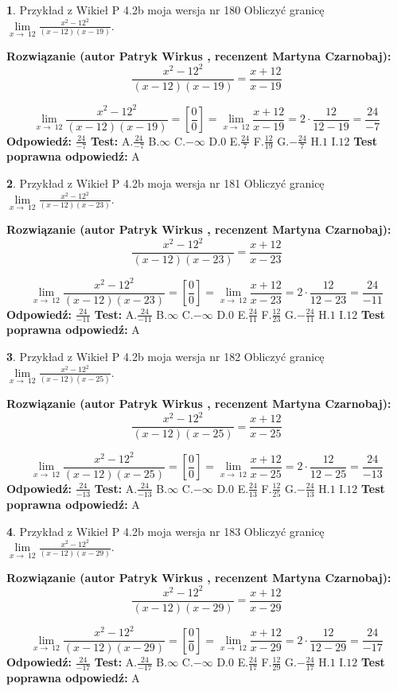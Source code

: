 \documentclass[12pt, a4paper]{article}
\theoremstyle{definition} %
\newtheorem{zad}{}
\newcommand{\zadStart}[1]{\begin{zad}#1\newline}
\newcommand{\zadStop}{\end{zad}}
\newcommand{\rozwStart}[2]{\noindent \textbf{Rozwiązanie (autor #1 , recenzent #2): }\newline}
\newcommand{\rozwStop}{\newline}
\newcommand{\odpStart}{\noindent \textbf{Odpowiedź:}\newline}
\newcommand{\odpStop}{\newline}
\newcommand{\testStart}{\noindent \textbf{Test:}\newline}
\newcommand{\testStop}{\newline}
\newcommand{\kluczStart}{\noindent \textbf{Test poprawna odpowiedź:}\newline}
\newcommand{\kluczStop}{\newline}
\begin{document}
\zadStart{Przykład z Wikieł P 4.2b moja wersja nr 180}
Obliczyć granicę $\lim\limits_{x\to\ 12}\frac{x^{2}-12^{2}}{(x-12)(x-19)}$.
\zadStop
\rozwStart{Patryk Wirkus}{Martyna Czarnobaj}
$$\frac{x^{2}-12^{2}}{(x-12)(x-19)}=\frac{x+12}{x-19}$$

$$\lim\limits_{x\to\ 12}\frac{x^{2}-12^{2}}{(x-12)(x-19)}=[\frac{0}{0}]=\lim\limits_{x\to\ 12}\frac{x+12}{x-19}=2 \cdot \frac{12}{12-19} = \frac{24}{-7}$$
\rozwStop
\odpStart
$\frac{24}{-7}$
\odpStop
\testStart
A.$\frac{24}{-7}$
B.$\infty$
C.$-\infty$
D.$0$
E.$\frac{24}{7}$
F.$\frac{12}{19}$
G.$-\frac{24}{7}$
H.$1$
I.$12$
\testStop
\kluczStart
A
\kluczStop



\zadStart{Przykład z Wikieł P 4.2b moja wersja nr 181}
Obliczyć granicę $\lim\limits_{x\to\ 12}\frac{x^{2}-12^{2}}{(x-12)(x-23)}$.
\zadStop
\rozwStart{Patryk Wirkus}{Martyna Czarnobaj}
$$\frac{x^{2}-12^{2}}{(x-12)(x-23)}=\frac{x+12}{x-23}$$

$$\lim\limits_{x\to\ 12}\frac{x^{2}-12^{2}}{(x-12)(x-23)}=[\frac{0}{0}]=\lim\limits_{x\to\ 12}\frac{x+12}{x-23}=2 \cdot \frac{12}{12-23} = \frac{24}{-11}$$
\rozwStop
\odpStart
$\frac{24}{-11}$
\odpStop
\testStart
A.$\frac{24}{-11}$
B.$\infty$
C.$-\infty$
D.$0$
E.$\frac{24}{11}$
F.$\frac{12}{23}$
G.$-\frac{24}{11}$
H.$1$
I.$12$
\testStop
\kluczStart
A
\kluczStop



\zadStart{Przykład z Wikieł P 4.2b moja wersja nr 182}
Obliczyć granicę $\lim\limits_{x\to\ 12}\frac{x^{2}-12^{2}}{(x-12)(x-25)}$.
\zadStop
\rozwStart{Patryk Wirkus}{Martyna Czarnobaj}
$$\frac{x^{2}-12^{2}}{(x-12)(x-25)}=\frac{x+12}{x-25}$$

$$\lim\limits_{x\to\ 12}\frac{x^{2}-12^{2}}{(x-12)(x-25)}=[\frac{0}{0}]=\lim\limits_{x\to\ 12}\frac{x+12}{x-25}=2 \cdot \frac{12}{12-25} = \frac{24}{-13}$$
\rozwStop
\odpStart
$\frac{24}{-13}$
\odpStop
\testStart
A.$\frac{24}{-13}$
B.$\infty$
C.$-\infty$
D.$0$
E.$\frac{24}{13}$
F.$\frac{12}{25}$
G.$-\frac{24}{13}$
H.$1$
I.$12$
\testStop
\kluczStart
A
\kluczStop



\zadStart{Przykład z Wikieł P 4.2b moja wersja nr 183}
Obliczyć granicę $\lim\limits_{x\to\ 12}\frac{x^{2}-12^{2}}{(x-12)(x-29)}$.
\zadStop
\rozwStart{Patryk Wirkus}{Martyna Czarnobaj}
$$\frac{x^{2}-12^{2}}{(x-12)(x-29)}=\frac{x+12}{x-29}$$

$$\lim\limits_{x\to\ 12}\frac{x^{2}-12^{2}}{(x-12)(x-29)}=[\frac{0}{0}]=\lim\limits_{x\to\ 12}\frac{x+12}{x-29}=2 \cdot \frac{12}{12-29} = \frac{24}{-17}$$
\rozwStop
\odpStart
$\frac{24}{-17}$
\odpStop
\testStart
A.$\frac{24}{-17}$
B.$\infty$
C.$-\infty$
D.$0$
E.$\frac{24}{17}$
F.$\frac{12}{29}$
G.$-\frac{24}{17}$
H.$1$
I.$12$
\testStop
\kluczStart
A
\kluczStop
\end{document}
